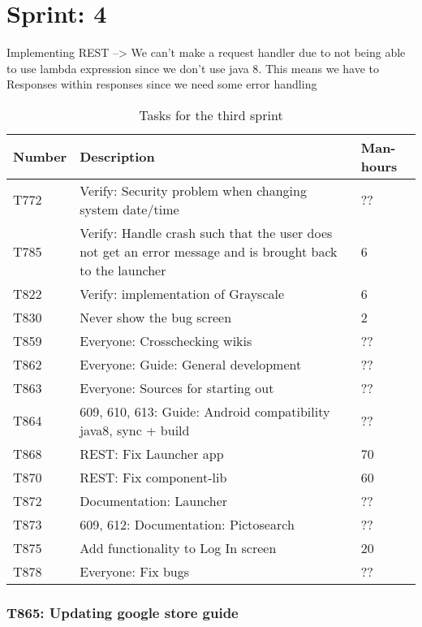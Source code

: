 \chapter{Sprint: 4}


Implementing REST --> We can't make a request handler due to not being able to
use lambda expression since we don't use java 8.
This means we have to Responses within responses since we need some error
handling

\begin{table}[H]
\begin{centering}
\begin{tabular}{|l|p{9cm}|l|}
\hline
Number 	& Description & Man-hours \\ \hline
T772    & Verify: Security problem when changing system date/time & ??\\\hline
T785	& Verify: Handle crash such that the user does not get an error message and
is brought back to the launcher & 6\\ \hline
T822    & Verify: implementation of Grayscale & 6\\\hline
T830    & Never show the bug screen & 2 \\\hline
T859   	& Everyone: Crosschecking wikis & ??\\\hline
T862  	& Everyone: Guide: General development & ?? \\ \hline
T863	& Everyone: Sources for starting out & ??\\ \hline
T864	& 609, 610, 613: Guide: Android compatibility java8, sync + build & ??\\
\hline 
T868    & REST: Fix Launcher app & 70 \\\hline
T870    & REST: Fix component-lib & 60\\\hline
T872 	& Documentation: Launcher & ??\\ \hline
T873 	& 609, 612: Documentation: Pictosearch & ??\\ \hline
T875 	& Add functionality to Log In screen & 20\\\hline 
T878 	& Everyone: Fix bugs & ??\\ \hline
\end{tabular}
\caption{Tasks for the third sprint}
\label{Tasks3}
\end{centering}
\end{table}


\subsection{T865: Updating google store guide}

